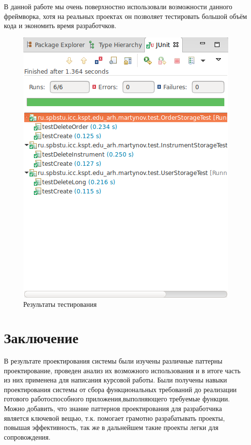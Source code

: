 \documentclass[a4paper, 12pt]{article}        %
\begin{document}
В данной работе мы очень поверхностно использовали возможности данного фреймворка, хотя на реальных проектах он позволяет тестировать большой объём кода и экономить время разработчков.

\begin{figure}[H]
\centering
\includegraphics[scale=0.65]{res/pic13}
\caption{Результаты тестирования}
\end{figure}

\newpage
\section*{Заключение}

В результате проектирования системы были изучены различные паттерны проектирование, проведен анализ их возможного использования и в итоге часть из них применена для написания курсовой работы. Были получены навыки проектирования системы от сбора функциональных требований до реализации готового работоспособного приложения,выполняющего требуемые функции. Можно добавить, что знание паттернов проектирования для разработчика является ключевой вещью, т.к. помогает грамотно разрабатывать проекты, повышая эффективность, так же в дальнейшем такие проекты легки для сопровождения.
\end{document}
